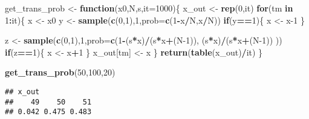 \documentclass[
]{article}
\newenvironment{Shaded}{\begin{snugshade}}{\end{snugshade}}
\newcommand{\AttributeTok}[1]{\textcolor[rgb]{0.13,0.29,0.53}{#1}}
\newcommand{\ControlFlowTok}[1]{\textcolor[rgb]{0.13,0.29,0.53}{\textbf{#1}}}
\newcommand{\DecValTok}[1]{\textcolor[rgb]{0.00,0.00,0.81}{#1}}
\newcommand{\FunctionTok}[1]{\textcolor[rgb]{0.13,0.29,0.53}{\textbf{#1}}}
\newcommand{\NormalTok}[1]{#1}
\newcommand{\OtherTok}[1]{\textcolor[rgb]{0.56,0.35,0.01}{#1}}
\newcommand{\SpecialCharTok}[1]{\textcolor[rgb]{0.81,0.36,0.00}{\textbf{#1}}}
\begin{document}
\begin{Shaded}
\begin{Highlighting}[]
\NormalTok{get\_trans\_prob }\OtherTok{\textless{}{-}} \ControlFlowTok{function}\NormalTok{(x0,N,s,}\AttributeTok{it=}\DecValTok{1000}\NormalTok{)\{}
\NormalTok{  x\_out }\OtherTok{\textless{}{-}} \FunctionTok{rep}\NormalTok{(}\DecValTok{0}\NormalTok{,it)}
  \ControlFlowTok{for}\NormalTok{(tm }\ControlFlowTok{in} \DecValTok{1}\SpecialCharTok{:}\NormalTok{it)\{}
\NormalTok{    x }\OtherTok{\textless{}{-}}\NormalTok{ x0}
\NormalTok{    y }\OtherTok{\textless{}{-}} \FunctionTok{sample}\NormalTok{(}\FunctionTok{c}\NormalTok{(}\DecValTok{0}\NormalTok{,}\DecValTok{1}\NormalTok{),}\DecValTok{1}\NormalTok{,}\AttributeTok{prob=}\FunctionTok{c}\NormalTok{(}\DecValTok{1}\SpecialCharTok{{-}}\NormalTok{x}\SpecialCharTok{/}\NormalTok{N,x}\SpecialCharTok{/}\NormalTok{N))}
    \ControlFlowTok{if}\NormalTok{(y}\SpecialCharTok{==}\DecValTok{1}\NormalTok{)\{}
\NormalTok{      x }\OtherTok{\textless{}{-}}\NormalTok{ x}\DecValTok{{-}1}
\NormalTok{    \}}
    
\NormalTok{    z }\OtherTok{\textless{}{-}} \FunctionTok{sample}\NormalTok{(}\FunctionTok{c}\NormalTok{(}\DecValTok{0}\NormalTok{,}\DecValTok{1}\NormalTok{),}\DecValTok{1}\NormalTok{,}\AttributeTok{prob=}\FunctionTok{c}\NormalTok{(}\DecValTok{1}\SpecialCharTok{{-}}\NormalTok{(s}\SpecialCharTok{*}\NormalTok{x)}\SpecialCharTok{/}\NormalTok{(s}\SpecialCharTok{*}\NormalTok{x}\SpecialCharTok{+}\NormalTok{(N}\DecValTok{{-}1}\NormalTok{)), (s}\SpecialCharTok{*}\NormalTok{x)}\SpecialCharTok{/}\NormalTok{(s}\SpecialCharTok{*}\NormalTok{x}\SpecialCharTok{+}\NormalTok{(N}\DecValTok{{-}1}\NormalTok{)) ))}
    \ControlFlowTok{if}\NormalTok{(z}\SpecialCharTok{==}\DecValTok{1}\NormalTok{)\{}
\NormalTok{      x }\OtherTok{\textless{}{-}}\NormalTok{ x}\SpecialCharTok{+}\DecValTok{1}
\NormalTok{    \}}
\NormalTok{    x\_out[tm] }\OtherTok{\textless{}{-}}\NormalTok{ x}
\NormalTok{  \}}
  \FunctionTok{return}\NormalTok{(}\FunctionTok{table}\NormalTok{(x\_out)}\SpecialCharTok{/}\NormalTok{it)}
\NormalTok{\}}

\FunctionTok{get\_trans\_prob}\NormalTok{(}\DecValTok{50}\NormalTok{,}\DecValTok{100}\NormalTok{,}\DecValTok{20}\NormalTok{)}
\end{Highlighting}
\end{Shaded}

\begin{verbatim}
## x_out
##    49    50    51 
## 0.042 0.475 0.483
\end{verbatim}
\end{document}
